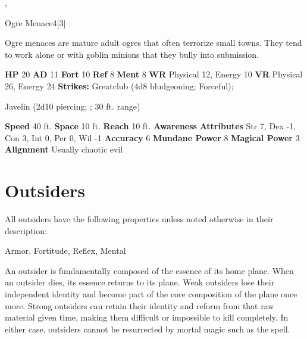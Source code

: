 {{  ,
  \begin{monsubsection}{Ogre Menace}{4}[3]
    \vspace{-1em}\vspace{-1em}
    \vspace{0em}

    
        Ogre menaces are mature adult ogres that often terrorize small towns.
        They tend to work alone or with goblin minions that they bully into submission.
      
    

    \begin{spellcontent}
      \begin{spelltargetinginfo}
        \pari \textbf{HP} 20 \monsep
          \textbf{AD} 11 \monsep
          \textbf{Fort} 10 \monsep
          \textbf{Ref} 8 \monsep
          \textbf{Ment} 8
        \pari \textbf{WR} Physical 12, Energy 10 \monsep
        \textbf{VR} Physical 26, Energy 24
        \pari \textbf{Strikes:}
            Greatclub  (4d8 bludgeoning; Forceful);
\par Javelin  (2d10 piercing; ; 30 ft. range)
      \end{spelltargetinginfo}
    \end{spellcontent}
    \begin{monsterfooter}
      \pari \textbf{Speed} 40 ft. \monsep
        \textbf{Space} 10 ft. \monsep
        \textbf{Reach} 10 ft.
      \pari \textbf{Awareness} 
      \pari \textbf{Attributes}
        Str 7, Dex -1,
        Con 3, Int 0,
        Per 0, Wil -1
      \pari \textbf{Accuracy} 6 \monsep
        \textbf{Mundane Power} 8 \monsep
      \textbf{Magical Power} 3
      \pari \textbf{Alignment} Usually chaotic evil
    \end{monsterfooter}
  \end{monsubsection}
  
  
  
        \section{Outsiders}

        All outsiders have the following properties unless noted otherwise in their description:
        
    
     Armor,
     Fortitude,
     Reflex,
     Mental
  
     An outsider is fundamentally composed of the essence of its home plane.
    When an outsider dies, its essence returns to its plane.
    Weak outsiders lose their independent identity and become part of the core composition of the plane once more.
    Strong outsiders can retain their identity and reform from that raw material given time, making them difficult or impossible to kill completely.
    In either case, outsiders cannot be resurrected by mortal magic such as the  spell.
  
}}
